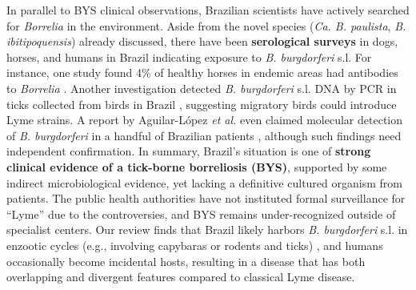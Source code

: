 \documentclass[11pt,letterpaper]{article}
\begin{document}
In parallel to BYS clinical observations, Brazilian scientists have actively searched for \textit{Borrelia} in the environment. Aside from the novel species (\textit{Ca. B. paulista}, \textit{B. ibitipoquensis}) already discussed, there have been \textbf{serological surveys} in dogs, horses, and humans in Brazil indicating exposure to \textit{B. burgdorferi} s.l. For instance, one study found 4\% of healthy horses in endemic areas had antibodies to \textit{Borrelia} \citep{Jorge2023, Jorge2023a}. Another investigation detected \textit{B. burgdorferi} s.l. DNA by PCR in ticks collected from birds in Brazil \citep{Lucca2024n}, suggesting migratory birds could introduce Lyme strains. A report by Aguilar-López \textit{et al.} even claimed molecular detection of \textit{B. burgdorferi} in a handful of Brazilian patients \citep{Lucca2024o}, although such findings need independent confirmation. In summary, Brazil’s situation is one of \textbf{strong clinical evidence of a tick-borne borreliosis (BYS)}, supported by some indirect microbiological evidence, yet lacking a definitive cultured organism from patients. The public health authorities have not instituted formal surveillance for “Lyme” due to the controversies, and BYS remains under-recognized outside of specialist centers. Our review finds that Brazil likely harbors \textit{B. burgdorferi} s.l. in enzootic cycles (e.g., involving capybaras or rodents and ticks) \citep{Jorge2023b}, and humans occasionally become incidental hosts, resulting in a disease that has both overlapping and divergent features compared to classical Lyme disease.
\end{document}
